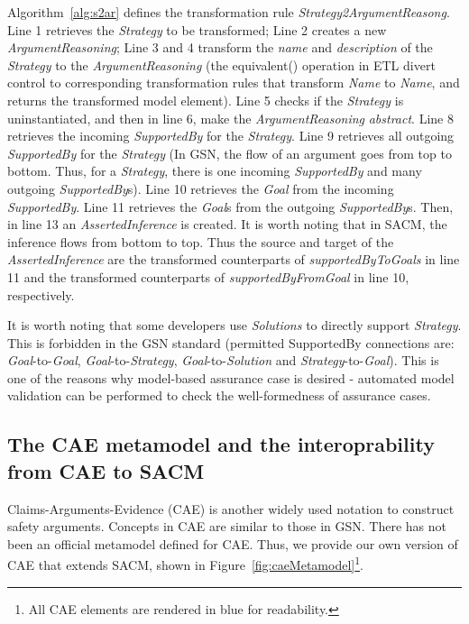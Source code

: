 Algorithm~\ref{alg:s2ar} defines the transformation rule \textit{Strategy2ArgumentReasong}. 
Line 1 retrieves the \textit{Strategy} to be transformed;
Line 2 creates a new \textit{ArgumentReasoning};
Line 3 and 4 transform the \textit{name} and \textit{description} of the \textit{Strategy} to the \textit{ArgumentReasoning} (the equivalent() operation in ETL divert control to corresponding transformation rules that transform \textit{Name} to \textit{Name}, and returns the transformed model element).
Line 5 checks if the \textit{Strategy} is uninstantiated, and then in line 6, make the \textit{ArgumentReasoning} \textit{abstract}.
Line 8 retrieves the incoming \textit{SupportedBy}  for the \textit{Strategy}.
Line 9 retrieves all outgoing \textit{SupportedBy} for the \textit{Strategy} (In GSN, the flow of an argument goes from top to bottom. Thus, for a \textit{Strategy}, there is one incoming \textit{SupportedBy} and many outgoing \textit{SupportedBy}s).
Line 10 retrieves the \textit{Goal} from the incoming \textit{SupportedBy}.
Line 11 retrieves the \textit{Goal}s from the outgoing \textit{SupportedBy}s. 
Then, in line 13 an \textit{AssertedInference} is created. 
It is worth noting that in SACM, the inference flows from bottom to top. Thus the source and target of the \textit{AssertedInference} are the transformed counterparts of \textit{supportedByToGoals} in line 11 and the transformed counterparts of \textit{supportedByFromGoal} in line 10, respectively.

It is worth noting that some developers use \textit{Solutions} to directly support \textit{Strategy}. 
This is forbidden in the GSN standard (permitted SupportedBy connections are: \textit{Goal}-to-\textit{Goal}, \textit{Goal}-to-\textit{Strategy}, \textit{Goal}-to-\textit{Solution} and \textit{Strategy}-to-\textit{Goal}). 
This is one of the reasons why model-based assurance case is desired - automated model validation can be performed to check the well-formedness of assurance cases.

\subsection{The CAE metamodel and the interoprability from CAE to SACM}
Claims-Arguments-Evidence (CAE) \cite{bishop2000methodology} is another widely used notation to construct safety arguments. Concepts in CAE are similar to those in GSN. 
There has not been an official metamodel defined for CAE. Thus, we provide our own version of CAE that extends SACM, shown in Figure~\ref{fig:caeMetamodel}\footnote{All CAE elements are rendered in blue for readability.}.


